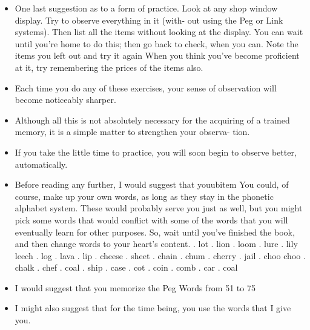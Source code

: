 \begin{itemize}
            \item One last suggestion as to a form of practice.
                \subitem Look at any
            shop window display.
                \subitem Try to observe everything in it (with-
            out using the Peg or Link systems).
                \subitem Then list all the items
            without looking at the display.
                \subitem You can wait until you're
            home to do this; then go back to check, when you can.
                \subitem Note
            the items you left out and try it again
                \subitem When you think
            you've become proficient at it, try remembering the prices
            of the items also.
            \item Each time you do any of these exercises, your sense of
            observation will become noticeably sharper.
            \item Although all
            this is not absolutely necessary for the acquiring of a trained
            memory, it is a simple matter to strengthen your observa-
            tion.
            \item If you take the little time to practice, you will soon
            begin to observe better, automatically.
            \item Before reading any further, I would suggest that youubitem You could, of course, make up your own words, as long
            as they stay in the phonetic alphabet system. These would
            probably serve you just as well, but you might pick some
            words that would conflict with some of the words that
            you will eventually learn for other purposes. So, wait until
            you've finished the book, and then change words to your
            heart's content.
                . lot
                . lion
                . loom
                . lure
                . lily
                 leech
                . log
                . lava
                . lip
                . cheese
                . sheet
                . chain
                . chum
                . cherry
                . jail
                . choo choo
                . chalk
                . chef
                . coal
                . ship
                . case
                . cot
                . coin
                . comb
                . car
                . coal
            \item I would suggest that you
            memorize the Peg Words from 51 to 75
            \item  I might also suggest that for the time being, you use the words that I give
            you.

        \end{itemize}

